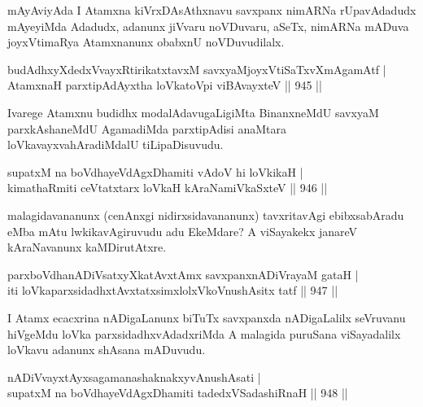 \begin{artha}
mAyAviyAda I Atamxna kiVrxDAsAthxnavu savxpanx nimARNa rUpavAdadudx mAyeyiMda Adadudx, adanunx jiVvaru noVDuvaru, aSeTx, nimARNa mADuva joyxVtimaRya Atamxnanunx obabxnU noVDuvudilalx.
\end{artha}

\begin{shl}
budAdhxyXdedxVvayxRtirikatxtavxM savxyaMjoyxVtiSaTxvXmAgamAtf | \\
AtamxnaH parxtipAdAyxtha loVkatoV\s pi viBAvayxteV \hfill||  945 ||  
\end{shl}

\begin{artha}
Ivarege Atamxnu budidhx modalAdavugaLigiMta BinanxneMdU savxyaM parxkAshaneMdU AgamadiMda parxtipAdisi anaMtara loVkavayxvahAradiMdalU tiLipaDisuvudu.
\end{artha}


\begin{shl}
supatxM na boVdhayeVdAgxDhamiti vAdoV hi loVkikaH | \\
kimathaRmiti ceVtatxtarx loVkaH kAraNamiVkaSxteV \hfill||  946 ||  
\end{shl}

\begin{artha}
malagidavananunx (cenAnxgi nidirxsidavananunx) tavxritavAgi ebibxsabAradu eMba mAtu lwkikavAgiruvudu adu EkeMdare? A viSayakekx janareV kAraNavanunx kaMDirutAtxre.
\end{artha}


\begin{shl}
parxboVdhanADiVsatxyXkatAvx\s \s tAmx savxpanxnADiVrayaM gataH | \\
iti loVkaparxsidadhxtAvxtatxsimxlolxVkoV\s nushAsitx tatf \hfill||  947 ||  
\end{shl}

\begin{artha}
I Atamx ecacxrina nADigaLanunx biTuTx savxpanxda nADigaLalilx seVruvanu hiVgeMdu loVka parxsidadhxvAdadxriMda A malagida puruSana viSayadalilx loVkavu adanunx shAsana mADuvudu.
\end{artha}


\begin{shl}
nADiVvayxtAyxsagamanashaknakxyvAnushAsati | \\
supatxM na boVdhayeVdAgxDhamiti tadedxVSadashiRnaH \hfill||  948 ||  
\end{shl}

